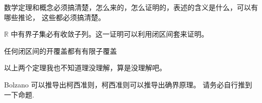 \begin{exposition}
    数学定理和概念必须搞清楚，怎么来的，怎么证明的，表述的含义是什么，可以有哪些推论，
    这些都必须搞清楚。
\end{exposition}

\begin{exposition}[Bolzano 定理]
    $\mathbb{R}$ 中有界子集必有收敛子列。这一证明可以利用闭区间套来证明。
\end{exposition}

\begin{exposition}
    任何闭区间的开覆盖都有有限子覆盖
\end{exposition}

\begin{exposition}
    以上两个定理我也不知道理没理解，算是没理解吧。
\end{exposition}

\begin{exposition}
    Bolzano 可以推导出柯西准则，柯西准则可以推导出确界原理。
    请务必自行推到一下命题.
\end{exposition}